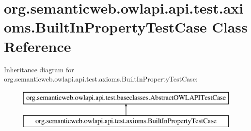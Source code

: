\hypertarget{classorg_1_1semanticweb_1_1owlapi_1_1api_1_1test_1_1axioms_1_1_built_in_property_test_case}{\section{org.\-semanticweb.\-owlapi.\-api.\-test.\-axioms.\-Built\-In\-Property\-Test\-Case Class Reference}
\label{classorg_1_1semanticweb_1_1owlapi_1_1api_1_1test_1_1axioms_1_1_built_in_property_test_case}
}
Inheritance diagram for org.\-semanticweb.\-owlapi.\-api.\-test.\-axioms.\-Built\-In\-Property\-Test\-Case\-:\begin{figure}[H]
\begin{center}
\leavevmode
\includegraphics[height=2.000000cm]{classorg_1_1semanticweb_1_1owlapi_1_1api_1_1test_1_1axioms_1_1_built_in_property_test_case}
\end{center}
\end{figure}
